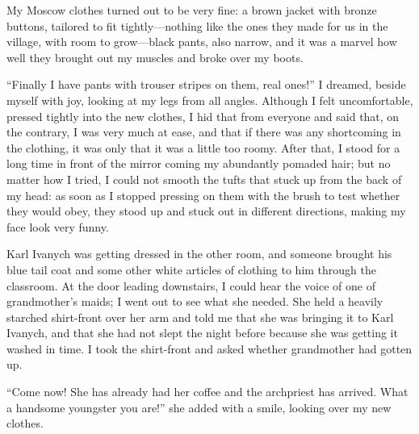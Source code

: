 My Moscow clothes turned out to be very fine: a brown jacket with bronze buttons, tailored to fit tightly---nothing like the ones they made for us in the village, with room to grow---black pants, also narrow, and it was a marvel how well they brought out my muscles and broke over my boots.

``Finally I have pants with trouser stripes on them, real ones!'' I dreamed, beside myself with joy, looking at my legs from all angles. Although I felt uncomfortable, pressed tightly into the new clothes, I hid that from everyone and said that, on the contrary, I was very much at ease, and that if there was any shortcoming in the clothing, it was only that it was a little too roomy. After that, I stood for a long time in front of the mirror coming my abundantly pomaded hair; but no matter how I tried, I could not smooth the tufts that stuck up from the back of my head: as soon as I stopped pressing on them with the brush to test whether they would obey, they stood up and stuck out in different directions, making my face look very funny.

Karl Ivanych was getting dressed in the other room, and someone brought his blue tail coat and some other white articles of clothing to him through the classroom. At the door leading downstairs, I could hear the voice of one of grandmother's maids; I went out to see what she needed. She held a heavily starched shirt-front over her arm and told me that she was bringing it to Karl Ivanych, and that she had not slept the night before because she was getting it washed in time. I took the shirt-front and asked whether grandmother had gotten up.

``Come now! She has already had her coffee and the archpriest has arrived. What a handsome youngster you are!'' she added with a smile, looking over my new clothes. %

